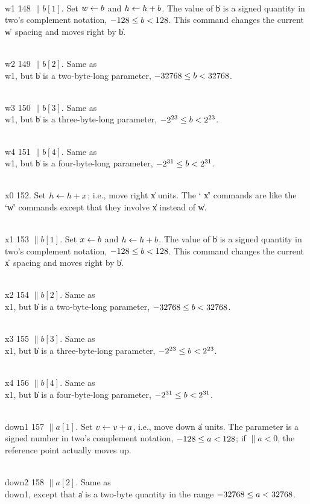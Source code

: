 \yskip\hang\\{w1} 148 $\|b[1]$. Set $\hbox{$w$}\gets\hbox{$b$}$ and $\hbox{$h$}\gets\hbox{$h$}+\hbox{$b$}$. The value of
\|b is a
signed quantity in two's complement notation, $-128\le\hbox{$b$}<128$. This command
changes the current \|w~spacing and moves right by \|b.

\yskip\hang\\{w2} 149 $\|b[2]$. Same as \\{w1}, but \|b is a two-byte-long
parameter, $-32768\le\hbox{$b$}<32768$.

\yskip\hang\\{w3} 150 $\|b[3]$. Same as \\{w1}, but \|b is a three-byte-long
parameter, $\hbox{$-2^{23}$}\le\hbox{$b$}<\hbox{$2^{23}$}$.

\yskip\hang\\{w4} 151 $\|b[4]$. Same as \\{w1}, but \|b is a four-byte-long
parameter, $\hbox{$-2^{31}$}\le\hbox{$b$}<\hbox{$2^{31}$}$.

\yskip\hang\\{x0} 152. Set $\hbox{$h$}\gets\hbox{$h$}+\hbox{$x$}$; i.e., move right \|x units. The `%
\|x'
commands are like the `\|w' commands except that they involve \|x instead
of \|w.

\yskip\hang\\{x1} 153 $\|b[1]$. Set $\hbox{$x$}\gets\hbox{$b$}$ and $\hbox{$h$}\gets\hbox{$h$}+\hbox{$b$}$. The value of
\|b is a
signed quantity in two's complement notation, $-128\le\hbox{$b$}<128$. This command
changes the current \|x~spacing and moves right by \|b.

\yskip\hang\\{x2} 154 $\|b[2]$. Same as \\{x1}, but \|b is a two-byte-long
parameter, $-32768\le\hbox{$b$}<32768$.

\yskip\hang\\{x3} 155 $\|b[3]$. Same as \\{x1}, but \|b is a three-byte-long
parameter, $\hbox{$-2^{23}$}\le\hbox{$b$}<\hbox{$2^{23}$}$.

\yskip\hang\\{x4} 156 $\|b[4]$. Same as \\{x1}, but \|b is a four-byte-long
parameter, $\hbox{$-2^{31}$}\le\hbox{$b$}<\hbox{$2^{31}$}$.

\yskip\hang\\{down1} 157 $\|a[1]$. Set $\hbox{$v$}\gets\hbox{$v$}+\hbox{$a$}$, i.e., move down \|a
units.
The parameter is a signed number in two's complement notation, $-128\le\hbox{$a$}<128$;
if $\|a<0$, the reference point actually moves up.

\yskip\hang\\{down2} 158 $\|a[2]$. Same as \\{down1}, except that \|a is a
two-byte quantity in the range $-32768\le\hbox{$a$}<32768$.

